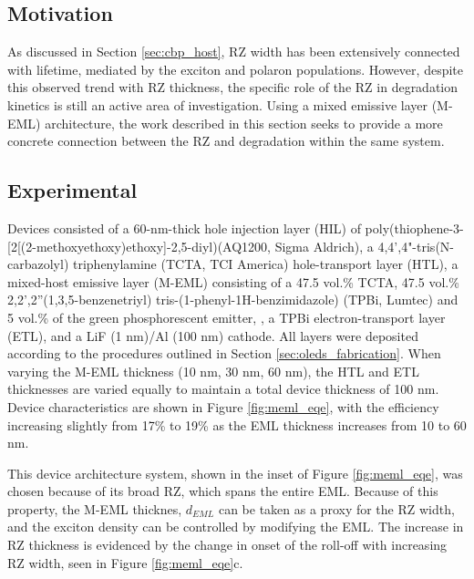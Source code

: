 \documentclass[../thesis.tex]{subfiles}
\begin{document}
\subsection{Motivation}

As discussed in Section \ref{sec:cbp_host}, RZ width has been extensively connected with lifetime, mediated by the exciton and polaron populations.\supercite{Scholz2015,Giebink2008a,Giebink2009a,So2010,Zhang2016,Schmidbauer2013,Wu2016,Lee2006,Chwang2002}
However, despite this observed trend with RZ thickness, the specific role of the RZ in degradation kinetics is still an active area of investigation.
Using a mixed emissive layer (M-EML) architecture, the work described in this section seeks to provide a more concrete connection between the RZ and degradation within the same system.  

\subsection{Experimental}


Devices consisted of a 60-nm-thick hole injection layer (HIL) of poly(thiophene-3-[2[(2-methoxyethoxy)ethoxy]-2,5-diyl)(AQ1200, Sigma Aldrich), a 4,4',4"-tris(N-carbazolyl) triphenylamine (TCTA, TCI America) hole-transport layer (HTL), a mixed-host emissive layer (M-EML) consisting of a 47.5 vol.\% TCTA, 47.5 vol.\% 2,2',2''(1,3,5-benzenetriyl) tris-(1-phenyl-1H-benzimidazole) (TPBi, Lumtec) and 5 vol.\% of the green phosphorescent emitter, \irppy , a TPBi electron-transport layer (ETL), and a LiF (1 nm)/Al (100 nm) cathode. 
All layers were deposited according to the procedures outlined in Section \ref{sec:oleds_fabrication}.
When varying the M-EML thickness (10 nm, 30 nm, 60 nm), the HTL and ETL thicknesses are varied equally to maintain a total device thickness of 100 nm.
Device characteristics are shown in Figure \ref{fig:meml_eqe}, with the efficiency increasing slightly from 17\% to 19\% as the EML thickness increases from 10 to 60 nm.

This device architecture system, shown in the inset of Figure \ref{fig:meml_eqe}, was chosen because of its broad RZ, which spans the entire EML.\supercite{Erickson2013a}
Because of this property, the M-EML thicknes, $d_{EML}$ can be taken as a proxy for the RZ width, and the exciton density can be controlled by modifying the EML.
The increase in RZ thickness is evidenced by the change in onset of the roll-off with increasing RZ width, seen in Figure \ref{fig:meml_eqe}c.
\end{document}
